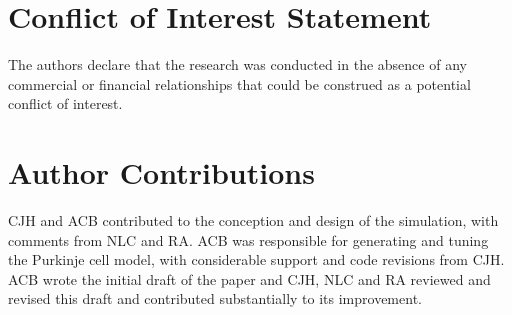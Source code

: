 \documentclass[utf8]{frontiersSCNS} %
\begin{document}
%
%
%
%

\section*{Conflict of Interest Statement}

The authors declare that the research was conducted in the absence of any commercial or financial relationships that could be construed as a potential conflict of interest.

\section*{Author Contributions}
CJH and ACB contributed to the conception and design of the simulation, with comments from NLC and RA. ACB was responsible for generating and tuning the Purkinje cell model, with considerable support and code revisions from CJH. ACB wrote the initial draft of the paper and CJH, NLC and RA reviewed and revised this draft and contributed substantially to its improvement.  
\end{document}
